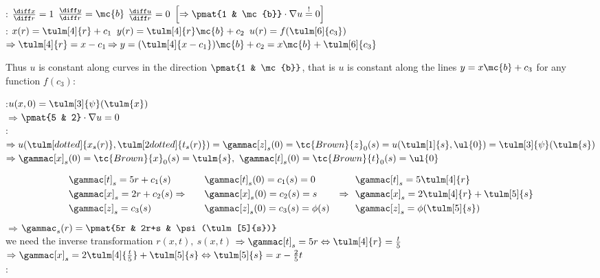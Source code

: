 \begin{notebox}[Example \normalfont{$u_x+\mc{b}u_y=0$}]
    :\hfil
        $\frac{\diff x}{\diff r}=1$\hfil
        $\frac{\diff y}{\diff r}=\mc{b}$\hfil
        $\frac{\diff u}{\diff r}=0$\hfil
        $\left[\Rightarrow\pmat{1 & \mc{b}}\cdot\nabla u\stackrel{!}{=}0\right]$\\
    :\hfil
        $x(r)=\tulm[4]{r}+c_1$\hfil
        $y(r)=\tulm[4]{r}\mc{b}+c_2$\hfil
        $u(r)=f(\tulm[6]{c_3})$\\
    $\Rightarrow\tulm[4]{r}=x-c_1$\hfil $\Rightarrow y=(\tulm[4]{x-c_1})\mc{b}+c_2=x\mc{b}+\tulm[6]{c_3}$\\
\end{notebox}
\begin{notebox}[Note]
    Thus $u$ is constant along curves in the direction $\pmat{1 & \mc{b}}$, that is $u$ is constant along the lines
    $y=x\mc{b}+c_3$ for any function $f(c_3)$:
\end{notebox}
\begin{notebox}[Example 2: \textnormal{$5u_t+2u_x=0$\hfil $\dot{t}=5,\ \dot{x}=2t,\ \dot{z}=0$}]
                :\hfil $u(x, 0)=\tulm[3]{\psi}(\tulm{x})$\\
                $\Rightarrow$\hfil $\pmat{5 & 2}\cdot\nabla u=0$\\
                :\\
                $\Rightarrow u(\tulm[dotted]{x_s(r)},\tulm[2dotted]{t_s(r)})=\gammac[z]_s(0)=\tc{Brown}{z}_0(s)=u(\tulm[1]{s},\ul{0})=\tulm[3]{\psi}(\tulm{s})$\\
                $\Rightarrow \gammac[x]_s(0)=\tc{Brown}{x}_0(s)=\tulm{s},\
                             \gammac[t]_s(0)=\tc{Brown}{t}_0(s)=\ul{0}$
\end{notebox}
\begin{notebox}[Solution 2]
                \nospacing
                \begin{alignat*}{3}
                    &\gammac[t]_s=5r+c_1(s)                      &  & \gammac[t]_s(0)=c_1(s)=0       & & \gammac[t]_s=5\tulm[4]{r}\\
                    &\gammac[x]_s=2r+c_2(s)     \Rightarrow\quad &  & \gammac[x]_s(0)=c_2(s)=s           &\Rightarrow\ \ & \gammac[x]_s=2\tulm[4]{r}+\tulm[5]{s}      \\
                    &\gammac[z]_s=c_3(s)                     &  & \gammac[z]_s(0)=c_3(s)=\phi(s) &                    & \gammac[z]_s=\phi(\tulm[5]{s})
                \end{alignat*}
                $\Rightarrow$\hfil$ \gammac_s(r)=\pmat{5r & 2r+s & \psi(\tulm[5]{s})}$\\
                \imp{Now} we need the inverse transformation $r(x,t),\ s(x,t)$
                $\Rightarrow \gammac[t]_s=5r \Leftrightarrow \tulm[4]{r}=\frac{t}{5}$\qquad
                    $\Rightarrow  \gammac[x]_s=2\tulm[4]{\frac{t}{5}}+\tulm[5]{s} \Leftrightarrow \tulm[5]{s}=x-\frac{2}{5}t$\\
                \imp{Thus}: \ctr{$u(x,t)=\psi(\tulm[5]{x-\frac{2}{5}t})$}
\end{notebox}
